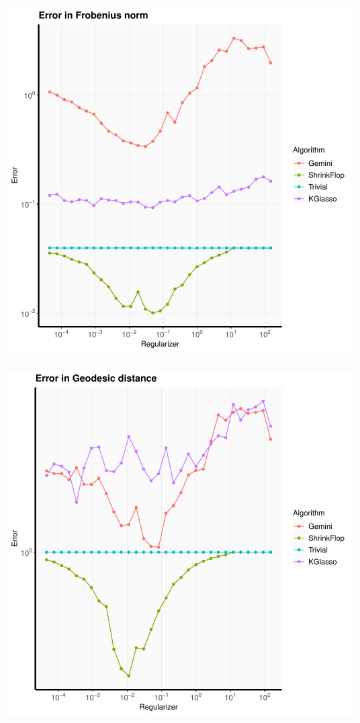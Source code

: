 \documentclass[aos]{imsart}
\theoremstyle{definition}
\numberwithin{equation}{section}
\begin{document}
\begin{figure}
         \centering
          \begin{subfigure}[b]{.4\textwidth}
         \includegraphics[width=\textwidth]{./code/zhou-comparison/25-50-spiked-frob.pdf}
         \end{subfigure}
          \begin{subfigure}[b]{.4\textwidth}
          \includegraphics[width=\textwidth]{./code/zhou-comparison/25-50-spiked-geo.pdf}

\end{subfigure}
\end{figure}
\end{document}
